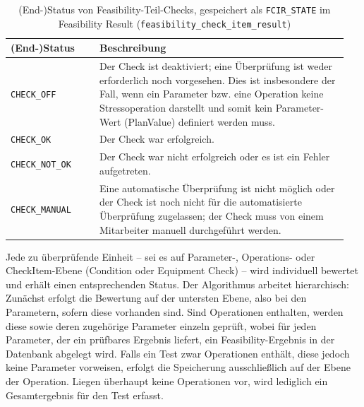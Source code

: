 \begin{table}[!htb]
    \centering
    \caption{(End-)Status von Feasibility-Teil-Checks, gespeichert als \texttt{FCIR\_STATE} im Feasibility Result (\texttt{feasibility\_check\_item\_result})}
    \footnotesize
    \renewcommand{\arraystretch}{1.3} %
    \begin{tabular}{p{0.25\linewidth} p{0.7\linewidth}}
        \toprule
        \textbf{(End-)Status} & \textbf{Beschreibung} \\
        \midrule
        \texttt{CHECK\_OFF} & Der Check ist deaktiviert; eine Überprüfung ist weder erforderlich noch vorgesehen. Dies ist insbesondere der Fall, wenn ein Parameter bzw. eine Operation keine Stressoperation darstellt und somit kein Parameter-Wert (PlanValue) definiert werden muss. \\
        \midrule
        \texttt{CHECK\_OK} & Der Check war erfolgreich. \\
        \midrule
        \texttt{CHECK\_NOT\_OK} & Der Check war nicht erfolgreich oder es ist ein Fehler aufgetreten. \\
        \midrule
        \texttt{CHECK\_MANUAL} & Eine automatische Überprüfung ist nicht möglich oder der Check ist noch nicht für die automatisierte Überprüfung zugelassen; der Check muss von einem Mitarbeiter manuell durchgeführt werden. \\
        \bottomrule
    \end{tabular}
    \label{tab:feasibility-states}
\end{table}

Jede zu überprüfende Einheit – sei es auf Parameter-, Operations- oder CheckItem-Ebene (Condition oder Equipment Check) – wird individuell bewertet und erhält einen entsprechenden Status. Der Algorithmus arbeitet hierarchisch: Zunächst erfolgt die Bewertung auf der untersten Ebene, also bei den Parametern, sofern diese vorhanden sind. Sind Operationen enthalten, werden diese sowie deren zugehörige Parameter einzeln geprüft, wobei für jeden Parameter, der ein prüfbares Ergebnis liefert, ein Feasibility-Ergebnis in der Datenbank abgelegt wird. Falls ein Test zwar Operationen enthält, diese jedoch keine Parameter vorweisen, erfolgt die Speicherung ausschließlich auf der Ebene der Operation. Liegen überhaupt keine Operationen vor, wird lediglich ein Gesamtergebnis für den Test erfasst.

